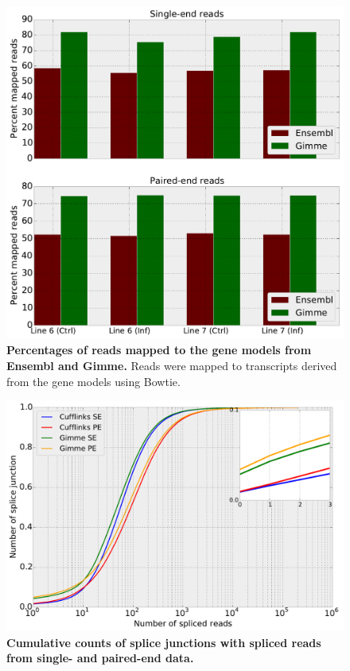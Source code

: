 \documentclass[10pt]{article}
\begin{document}
\begin{figure}[!ht]
\begin{center}
\includegraphics[width=5in]{mapped-reads.pdf}
\end{center}
\caption{
{\bf Percentages of reads mapped to the gene models from Ensembl
and Gimme.}
Reads were mapped to transcripts derived from the gene models
using Bowtie.
}
\label{mapped-reads}
\end{figure}

\begin{figure}[!ht]
\begin{center}
\includegraphics[width=5in]{cdf_splice.pdf}
\end{center}
\caption{
{\bf Cumulative counts of splice junctions with spliced reads from single- and
paired-end data.}
}
\label{cdf_splice}
\end{figure}
\end{document}

